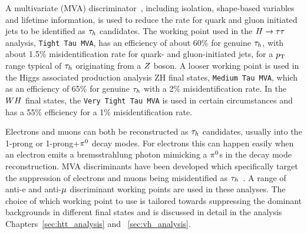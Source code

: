 A multivariate (MVA) discriminator~\cite{Hocker:2007ht}, including isolation, shape-based variables
and lifetime information, is used to reduce the rate for  quark and gluon initiated jets
to be identified as $\tau_{h}$ candidates. The working point used in the $H\to\tau\tau$ analysis, \texttt{Tight Tau MVA},
has an efficiency of about 60\% for genuine $\tau_{h}$,
with about 1.5\% misidentification rate for quark- and gluon-initiated jets, for a $p_\mathrm{T}$ range typical 
of $\tau_{h}$ originating from a $Z$ boson. A looser working point is used in the Higgs associated 
production analysis ZH final states, \texttt{Medium Tau MVA}, which as an efficiency of 65\% for genuine
$\tau_{h}$ with a 2\% misidentification rate. In the $WH$ final states, the \texttt{Very Tight Tau MVA}
is used in certain circumstances and has a 55\% efficiency for a 1\% misidentification rate.

Electrons and muons can both be reconstructed as $\tau_{h}$ candidates, usually into the 1-prong or
1-prong+$\pi^{0}$ decay modes. For electrons this can happen easily when an electron emits a bremsstrahlung
photon mimicking a $\pi^{0}$s in the decay mode reconstruction. MVA discriminants have been developed 
which specifically target the suppression of electrons and muons being misidentified as 
$\tau_{h}$~\cite{Khachatryan:2015dfa, CMS-PAS-TAU-16-002}.
A range of anti-e and anti-$\mu$ discriminant working points are used in these analyses. The choice
of which working point to use is tailored towards suppressing the dominant backgrounds in different
final states and is discussed in detail in the analysis Chapters~\ref{sec:htt_analysis} and ~\ref{sec:vh_analysis}.


